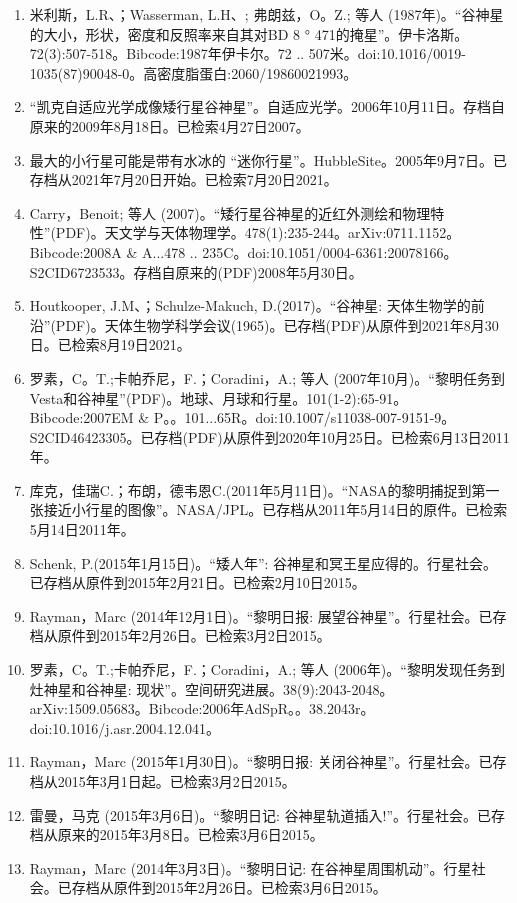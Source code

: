 \begin{enumerate}
\item 米利斯，L.R、；Wasserman, L.H、; 弗朗兹，O。Z.; 等人 (1987年)。“谷神星的大小，形状，密度和反照率来自其对BD 8 ° 471的掩星”。伊卡洛斯。72(3):507-518。Bibcode:1987年伊卡尔。72 .. 507米。doi:10.1016/0019-1035(87)90048-0。高密度脂蛋白:2060/19860021993。
\item “凯克自适应光学成像矮行星谷神星”。自适应光学。2006年10月11日。存档自原来的2009年8月18日。已检索4月27日2007。
\item 最大的小行星可能是带有水冰的 “迷你行星”。HubbleSite。2005年9月7日。已存档从2021年7月20日开始。已检索7月20日2021。
\item Carry，Benoit; 等人 (2007)。“矮行星谷神星的近红外测绘和物理特性”(PDF)。天文学与天体物理学。478(1):235-244。arXiv:0711.1152。Bibcode:2008A & A...478 .. 235C。doi:10.1051/0004-6361:20078166。S2CID6723533。存档自原来的(PDF)2008年5月30日。  
\item Houtkooper, J.M、；Schulze-Makuch, D.(2017)。“谷神星: 天体生物学的前沿”(PDF)。天体生物学科学会议(1965)。已存档(PDF)从原件到2021年8月30日。已检索8月19日2021。
\item 罗素，C。T.;卡帕乔尼，F.；Coradini，A.; 等人 (2007年10月)。“黎明任务到Vesta和谷神星”(PDF)。地球、月球和行星。101(1-2):65-91。Bibcode:2007EM & P。。101...65R。doi:10.1007/s11038-007-9151-9。S2CID46423305。已存档(PDF)从原件到2020年10月25日。已检索6月13日2011年。  
\item 库克，佳瑞C.；布朗，德韦恩C.(2011年5月11日)。“NASA的黎明捕捉到第一张接近小行星的图像”。NASA/JPL。已存档从2011年5月14日的原件。已检索5月14日2011年。
\item Schenk, P.(2015年1月15日)。“矮人年”: 谷神星和冥王星应得的。行星社会。已存档从原件到2015年2月21日。已检索2月10日2015。
\item Rayman，Marc (2014年12月1日)。“黎明日报: 展望谷神星”。行星社会。已存档从原件到2015年2月26日。已检索3月2日2015。
\item 罗素，C。T.;卡帕乔尼，F.；Coradini，A.; 等人 (2006年)。“黎明发现任务到灶神星和谷神星: 现状”。空间研究进展。38(9):2043-2048。arXiv:1509.05683。Bibcode:2006年AdSpR。。38.2043r。doi:10.1016/j.asr.2004.12.041。
\item Rayman，Marc (2015年1月30日)。“黎明日报: 关闭谷神星”。行星社会。已存档从2015年3月1日起。已检索3月2日2015。
\item 雷曼，马克 (2015年3月6日)。“黎明日记: 谷神星轨道插入!”。行星社会。已存档从原来的2015年3月8日。已检索3月6日2015。
\item Rayman，Marc (2014年3月3日)。“黎明日记: 在谷神星周围机动”。行星社会。已存档从原件到2015年2月26日。已检索3月6日2015。

\end{enumerate}
